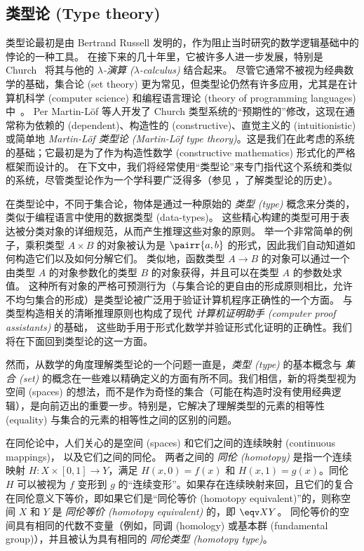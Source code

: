 \subsection*{类型论 (Type theory)}

类型论最初是由 Bertrand Russell 发明的\cite{Russell:1908}，作为阻止当时研究的数学逻辑基础中的悖论的一种工具。
在接下来的几十年里，它被许多人进一步发展，特别是 Church~\cite{Church:1940tu,Church:1941tc} 将其与他的 \textit{$\lambda$-演算 ($\lambda$-calculus)} 结合起来。
尽管它通常不被视为经典数学的基础，集合论 (set theory) 更为常见，但类型论仍然有许多应用，尤其是在计算机科学 (computer science) 和编程语言理论 (theory of programming languages) 中~\cite{Pierce-TAPL}。
Per Martin-L\"{o}f \cite{Martin-Lof-1972,Martin-Lof-1973,Martin-Lof-1979,martin-lof:bibliopolis} 等人开发了 Church 类型系统的“预期性的”修改，这现在通常称为依赖的 (dependent)、构造性的 (constructive)、直觉主义的 (intuitionistic) 或简单地 \emph{Martin\--L\"of 类型论 (Martin-Löf type theory)}。这是我们在此考虑的系统的基础；它最初是为了作为构造性数学 (constructive mathematics) 形式化的严格框架而设计的。
在下文中，我们将经常使用“类型论”来专门指代这个系统和类似的系统，尽管类型论作为一个学科要广泛得多（参见 \cite{somma,kamar}，了解类型论的历史）。

在类型论中，不同于集合论，物体是通过一种原始的 \emph{类型 (type)} 概念来分类的，类似于编程语言中使用的数据类型 (data-types)。
这些精心构建的类型可用于表达被分类对象的详细规范，从而产生推理这些对象的原则。
举一个非常简单的例子，乘积类型 $A\times B$ 的对象被认为是 $\pairr{a,b}$ 的形式，因此我们自动知道如何构造它们以及如何分解它们。
类似地，函数类型 $A\to B$ 的对象可以通过一个由类型 $A$ 的对象参数化的类型 $B$ 的对象获得，并且可以在类型 $A$ 的参数处求值。
这种所有对象的严格可预测行为（与集合论的更自由的形成原则相比，允许不均匀集合的形成）是类型论被广泛用于验证计算机程序正确性的一个方面。
与类型构造相关的清晰推理原则也构成了现代 \emph{计算机证明助手 (computer proof assistants)} 的基础，
这些助手用于形式化数学并验证形式化证明的正确性。我们将在下面回到类型论的这一方面。

然而，从数学的角度理解类型论的一个问题一直是，\emph{类型 (type)} 的基本概念与 \emph{集合 (set)} 的概念在一些难以精确定义的方面有所不同。我们相信，新的将类型视为空间 (spaces) 的想法，而不是作为奇怪的集合（可能在构造时没有使用经典逻辑），是向前迈出的重要一步。特别是，它解决了理解类型的元素的相等性 (equality) 与集合的元素的相等性之间的区别的问题。

在同伦论中，人们关心的是空间 (spaces) 和它们之间的连续映射 (continuous mappings)， 以及它们之间的同伦。
两者之间的 \emph{同伦 (homotopy)} 是指一个连续映射 $H : X \times [0, 1] \to Y$，满足 $H(x, 0) = f (x)$ 和 $H(x, 1) = g(x)$。同伦 $H$ 可以被视为 $f$ 变形到 $g$ 的“连续变形”。如果存在连续映射来回，且它们的复合在同伦意义下等价，即如果它们是“同伦等价 (homotopy equivalent)”的，则称空间 $X$ 和 $Y$ 是 \emph{同伦等价 (homotopy equivalent)} 的，即 $\eqv X Y$。
同伦等价的空间具有相同的代数不变量（例如，同调 (homology) 或基本群 (fundamental group)），并且被认为具有相同的 \emph{同伦类型 (homotopy type)}。


